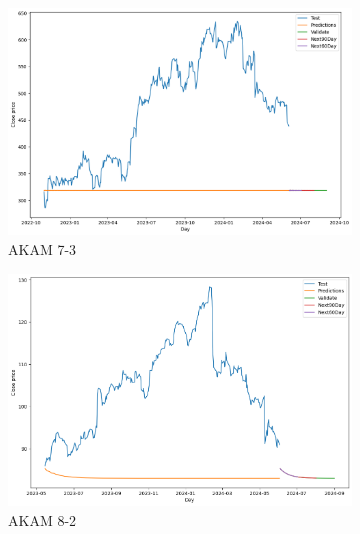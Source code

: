 \documentclass{ieeeojies}
\begin{document}
\begin{figure}[H]
    \centering
    \begin{subfigure}[h]{0.33\linewidth}
        \centering
        \includegraphics[width=\linewidth]{ARIMA Plot/ARIMA_AKAM_7_3.png}
        \caption{AKAM 7-3}
        \label{fig:akam-7-3}
    \end{subfigure}%
    \hfill
    \begin{subfigure}[h]{0.33\linewidth}
        \centering
        \includegraphics[width=\linewidth]{ARIMA Plot/ARIMA_AKAM_8_2.png}
        \caption{AKAM 8-2}
        \label{fig:akam-8-2}
    \end{subfigure}%
    \hfill
    \begin{subfigure}[h]{0.33\linewidth}
        \centering

\end{subfigure}
\end{figure}
\end{document}
